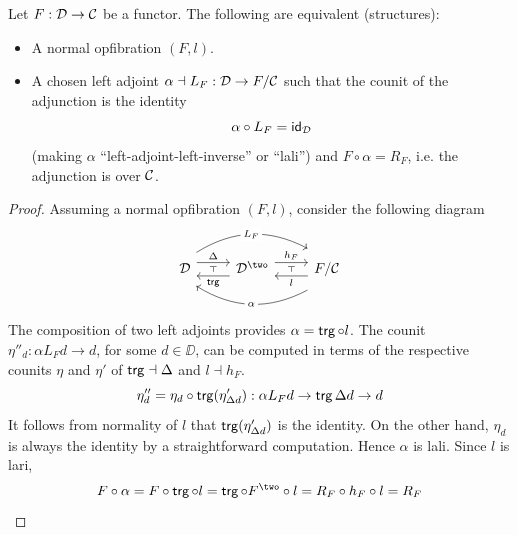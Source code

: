 \begin{proposition}\label{prop:normal-opfibration-algebra}
  Let $F : \mathcal{D} \to \mathcal{C}$ be a functor.
  The following are equivalent (structures):
  \begin{itemize}
    \item A normal opfibration $(F,l)$.
    \item A chosen left adjoint $\alpha \dashv L_F : \mathcal{D} \to F / \mathcal{C}$
    such that the counit of the adjunction is the identity
    \[\alpha \circ L_F = \mathsf{id}_{\mathcal{D}}\]
    (making $\alpha$ ``left-adjoint-left-inverse'' or ``lali'')
    and $F \circ \alpha = R_F$, i.e. the adjunction is over $\mathcal{C}$.
  \end{itemize}
\end{proposition}
\begin{proof}
  Assuming a normal opfibration $(F,l)$,
  consider the following diagram
  \[ \begin{tikzcd}
    \DD & {\DD^\two} & {F / \CC}
    \arrow[""{name=0, anchor=center, inner sep=0}, "\Delta", shift left=2, from=1-1, to=1-2]
    \arrow["{L_F}"{description}, shift left=3, bend left, from=1-1, to=1-3]
    \arrow[""{name=1, anchor=center, inner sep=0}, "\trg", shift left=2, from=1-2, to=1-1]
    \arrow[""{name=2, anchor=center, inner sep=0}, "{h_F}", shift left=2, from=1-2, to=1-3]
    \arrow["\alpha"{description}, shift left=3, bend left, from=1-3, to=1-1]
    \arrow[""{name=3, anchor=center, inner sep=0}, "l", shift left=2, from=1-3, to=1-2]
    \arrow["\dashv"{anchor=center, rotate=90}, draw=none, from=1, to=0]
    \arrow["\dashv"{anchor=center, rotate=90}, draw=none, from=3, to=2]
  \end{tikzcd}\]
  The composition of two left adjoints provides $\alpha = \mathop{\mathsf{trg}} \circ l$.
  The counit $\eta''_d : \alpha L_F d \to d$,
  for some $d \in \DD$,
  can be computed in terms of the respective counits $\eta$ and $\eta'$ of
  $\mathop{\mathsf{trg}} \dashv \Delta$ and $l \dashv h_F$.
  \[ \eta''_d = \eta_d \circ \mathop{\mathsf{trg}} (\eta'_{\Delta d}) : \alpha L_F d \to \mathop{\mathsf{trg}} \Delta d \to d \]
  It follows from normality of $l$ that
  $\mathop{\mathsf{trg}} (\eta'_{\Delta d})$ is the identity.
  On the other hand, $\eta_d$ is always the identity by a straightforward computation.
  Hence $\alpha$ is lali.
  Since $l$ is lari, 
  \[F \circ \alpha = F \circ \trg \circ l = \trg \circ F^\two \circ l = R_F \circ h_F \circ l = R_F\]


\end{proof}
